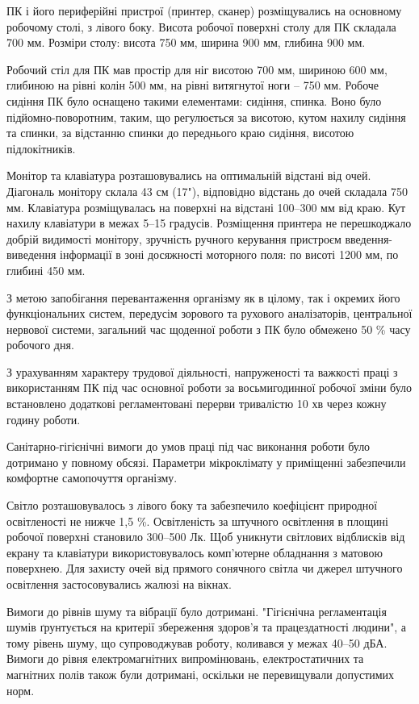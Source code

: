 ПК і його периферійні пристрої (принтер, сканер) розміщувались на основному робочому столі, з лівого боку. Висота робочої поверхні столу для ПК складала 700 мм. Розміри столу: висота 750 мм, ширина 900 мм, глибина 900 мм.

Робочий стіл для ПК мав простір для ніг висотою 700 мм, шириною 600 мм, глибиною на рівні колін 500 мм, на рівні витягнутої ноги – 750 мм. Робоче сидіння ПК було оснащено такими елементами: сидіння, спинка. Воно було підйомно-поворотним, таким, що регулюється за висотою, кутом нахилу сидіння та спинки, за відстанню спинки до переднього краю сидіння, висотою підлокітників.

Монітор та клавіатура розташовувались на оптимальній відстані від очей. Діагональ монітору склала  43 см (17"), відповідно відстань до очей складала 750 мм. Клавіатура розміщувалась на поверхні на відстані 100–300 мм від краю. Кут нахилу клавіатури в межах 5–15 градусів. Розміщення принтера не перешкоджало добрій видимості монітору, зручність ручного керування пристроєм введення-виведення інформації в зоні досяжності моторного поля: по висоті 1200 мм, по глибині 450 мм.

З метою запобігання перевантаження організму як в цілому, так і окремих його функціональних систем, передусім зорового та рухового аналізаторів, центральної нервової системи, загальний час щоденної роботи з ПК було обмежено 50 \% часу робочого дня.

З урахуванням характеру трудової діяльності, напруженості та важкості праці з використанням ПК під час основної роботи за восьмигодинної робочої зміни було встановлено додаткові регламентовані перерви тривалістю 10 хв через кожну годину роботи.

Санітарно-гігієнічні вимоги до умов праці під час виконання роботи було дотримано у повному обсязі. Параметри мікроклімату у приміщенні забезпечили комфортне самопочуття організму.

Світло розташовувалось з лівого боку та забезпечило коефіцієнт природної освітленості не нижче 1,5 \%. Освітленість за штучного освітлення в площині робочої поверхні становило 300–500 Лк. Щоб уникнути світлових відблисків від екрану та клавіатури використовувалось комп’ютерне обладнання з матовою поверхнею. Для захисту очей  від прямого сонячного світла чи джерел штучного освітлення застосовувались жалюзі на вікнах.

Вимоги до рівнів шуму та вібрації було дотримані. "Гігієнічна регламентація шумів ґрунтується на критерії збереження здоров'я та працездатності людини", а тому рівень шуму, що супроводжував роботу, коливався у межах 40–50 дБА. Вимоги до рівня електромагнітних випромінювань, електростатичних та магнітних полів також були дотримані, оскільки не перевищували допустимих норм.

